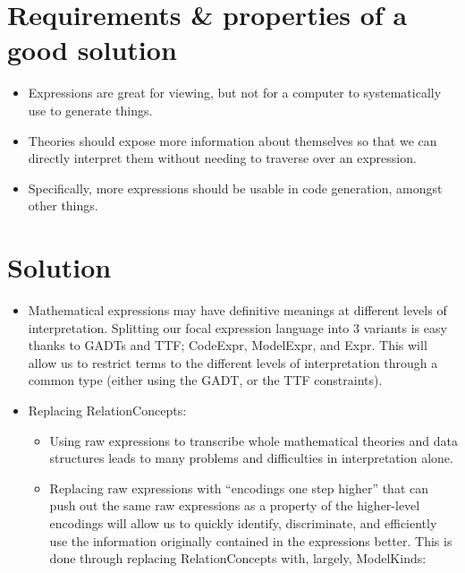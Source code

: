 \section{Requirements \& properties of a good solution}

\begin{itemize}

	\item Expressions are great for viewing, but not for a computer to
	      systematically use to generate things.

	\item Theories should expose more information about themselves so that
	      we can directly interpret them without needing to traverse over
	      an expression.

	\item Specifically, more expressions should be usable in code generation,
	      amongst other things.

\end{itemize}

\section{Solution}

\begin{itemize}

	\item Mathematical expressions may have definitive meanings
	      at different levels of interpretation. Splitting our
	      focal expression language into 3 variants is easy
	      thanks to GADTs and TTF; CodeExpr, ModelExpr, and Expr.
	      This will allow us to restrict terms to the different
	      levels of interpretation through a common type (either
	      using the GADT, or the TTF constraints).

	\item Replacing RelationConcepts:

	      \begin{itemize}

		      \item Using raw expressions to transcribe whole mathematical
		            theories and data structures leads to many problems
		            and difficulties in interpretation alone.

		      \item Replacing raw expressions with ``encodings one step
		            higher'' that can push out the same raw expressions
		            as a property of the higher-level encodings will
		            allow us to quickly identify, discriminate, and efficiently
		            use the information originally contained in the expressions
		            better. This is done through replacing RelationConcepts
		            with, largely, ModelKinds:

	      \end{itemize}

\end{itemize}

